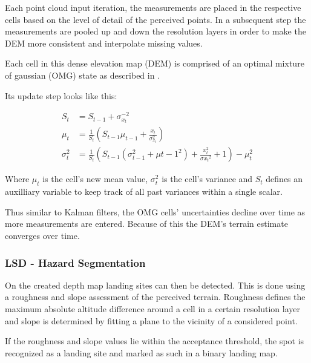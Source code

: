 Each point cloud input iteration, the measurements are placed in the respective cells based on the level of detail of the perceived points. In a subsequent step the measurements are pooled up and down the resolution layers in order to make the DEM more consistent and interpolate missing values.

Each cell in this dense elevation map (DEM) is comprised of an optimal mixture of gaussian (OMG) state as described in \citet{LSD2}.

Its update step looks like this:

\begin{align}
    S_t &= S_{t-1} + \sigma_{x_t}^{-2}\\
    \mu_t &=  \frac{1}{S_t}\left(S_{t-1}\mu_{t-1} + \frac{x_t}{\sigma_{x_t}^2}\right)\\
    \sigma_t^2 &=  \frac{1}{S_t}\left( S_{t-1}(\sigma_{t-1}^2 + \mu{t-1}^2) + \frac{x_t^2}{\sigma{x_t}^2} + 1 \right) - \mu_t^2
    \label{eq:OMG_updates}
\end{align}

Where $\mu_t$ is the cell's new mean value, $\sigma_t^2$ is the cell's variance and $S_t$ defines an auxilliary variable to keep track of all past variances within a single scalar.

Thus similar to Kalman filters, the OMG cells' uncertainties decline over time as more measurements are entered. Because of this the DEM's terrain estimate converges over time. 

\subsubsection{LSD - Hazard Segmentation}\label{subsubsec:setup:haz_seg}

On the created depth map landing sites can then be detected. This is done using a roughness and slope assessment of the perceived terrain. Roughness defines the maximum absolute altitude difference around a cell in a certain resolution layer and slope is determined by fitting a plane to the vicinity of a considered point.

If the roughness and slope values lie within the acceptance threshold, the spot is recognized as a landing site and marked as such in a binary landing map. 

